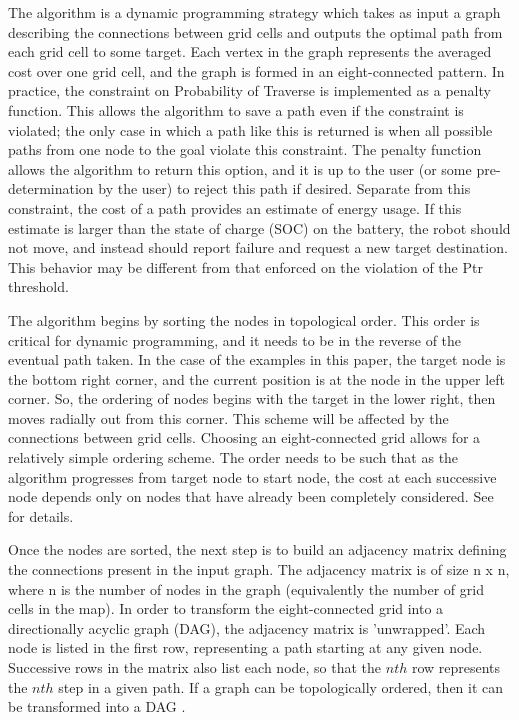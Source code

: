 \documentclass[journal]{IEEEtran}
\begin{document}
The algorithm is a dynamic programming strategy which takes as input a graph describing the connections between grid cells and outputs the optimal path from each grid cell to some target. Each vertex in the graph represents the averaged cost over one grid cell, and the graph is formed in an eight-connected pattern. 
In practice, the constraint on Probability of Traverse is implemented as a penalty function. 
This allows the algorithm to save a path even if the constraint is violated; the only case in which a path like this is returned is when all possible paths from one node to the goal violate this constraint. 
The penalty function allows the algorithm to return this option, and it is up to the user (or some pre-determination by the user) to reject this path if desired. 
Separate from this constraint, the cost of a path provides an estimate of energy usage. 
If this estimate is larger than the state of charge (SOC) on the battery, the robot should not move, and instead should report failure and request a new target destination. 
This behavior may be different from that enforced on the violation of the Ptr threshold.

The algorithm begins by sorting the nodes in topological order. 
This order is critical for dynamic programming, and it needs to be in the reverse of the eventual path taken. 
In the case of the examples in this paper, the target node is the bottom right corner, and the current position is at the node in the upper left corner. 
So, the ordering of nodes begins with the target in the lower right, then moves radially out from this corner. 
This scheme will be affected by the connections between grid cells. 
Choosing an eight-connected grid allows for a relatively simple ordering scheme. 
The order needs to be such that as the algorithm progresses from target node to start node, the cost at each successive node depends only on nodes that have already been completely considered. 
See \cite{(Dynamic Programming book)} for details.

Once the nodes are sorted, the next step is to build an adjacency matrix defining the connections present in the input graph.
The adjacency matrix is of size n x n, where n is the number of nodes in the graph (equivalently the number of grid cells in the map). 
In order to transform the eight-connected grid into a directionally acyclic graph (DAG), the adjacency matrix is 'unwrapped'. 
Each node is listed in the first row, representing a path starting at any given node. 
Successive rows in the matrix also list each node, so that the $nth$ row represents the $nth$ step in a given path. 
If a graph can be topologically ordered, then it can be transformed into a DAG \cite{vazirani algorithms ch. 6}.
\end{document}
